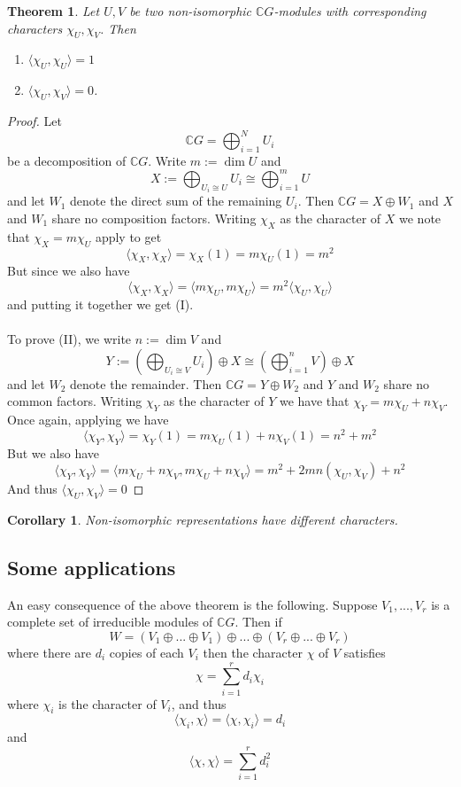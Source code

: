 \documentclass[11pt, notitlepage]{article}
\numberwithin{equation}{section}
\theoremstyle{plain}
\newtheorem{theorem}{Theorem}[section]
\newtheorem{corollary}{Corollary}[theorem]
\theoremstyle{definition}
\newcommand{\CG}{{\mathbb{C}G}}
\begin{document}
\begin{theorem}
	Let $U, V$ be two non-isomorphic $\CG$-modules with corresponding characters $\chi_U, \chi_V$. Then 
	\begin{enumerate}[label=\emph{(\Roman*)}]
		\item $\langle \chi_U, \chi_U \rangle = 1$
		\item $\langle \chi_U, \chi_V \rangle = 0$.
	\end{enumerate} 
\end{theorem}
\begin{proof}
	Let \[\CG = \bigoplus_{i = 1}^N U_i \] be a decomposition of $\CG$. Write $m:= \dim U$ and \[X:= \bigoplus_{U_i \cong U} U_i \cong \bigoplus_{i = 1}^{m} U\] and let $W_1$ denote the direct sum of the remaining $U_i$. Then $\CG = X \oplus W_1$ and $X$ and $W_1$ share no composition factors. Writing $\chi_X$ as the character of $X$ we note that $\chi_X = m\chi_U$ apply  to get \[ \langle \chi_X, \chi_X \rangle = \chi_X(1) = m \chi_U(1) = m^2\] But since we also have \[\langle \chi_X, \chi_X \rangle = \langle m\chi_U, m\chi_U \rangle = m^2 \langle \chi_U, \chi_U \rangle \] and putting it together we get (I).
	\\\\
	To prove (II), we write $n:= \dim V$ and \[Y:= \left(\bigoplus_{U_i \cong V} U_i\right)\oplus X \cong\left(\bigoplus_{i = 1}^{n} V\right) \oplus X \] and let $W_2$ denote the remainder. Then $\CG = Y \oplus W_2$ and $Y$ and $W_2$ share no common factors. Writing $\chi_Y$ as the character of $Y$ we have that $\chi_Y = m \chi_U + n \chi_V$. Once again, applying  we have \[ \langle \chi_Y, \chi_Y \rangle = \chi_Y(1) = m\chi_U(1) + n\chi_V(1) = n^2 + m^2\] But we also have \[ \langle \chi_Y, \chi_Y \rangle = \langle m\chi_U + n\chi_V, m\chi_U + n\chi_V \rangle = m^2  + 2mn(\chi_U, \chi_V) + n^2  \] And thus $ \langle \chi_U, \chi_V \rangle = 0$
\end{proof}
\begin{corollary}
	Non-isomorphic representations have different characters.
\end{corollary}

\subsection{Some applications}

An easy consequence of the above theorem is the following. Suppose $V_1,...,V_r$ is a complete set of irreducible modules of $\CG$. Then if \[W = (V_1\oplus...\oplus V_1) \oplus ...\oplus (V_r\oplus ... \oplus V_r)\] where there are $d_i$ copies of each $V_i$ then the character $\chi$ of $V$ satisfies \[\chi = \sum_{i = 1}^r d_i \chi_i \] where $\chi_i$ is the character of $V_i$, and thus $$ \langle \chi_i, \chi \rangle = \langle \chi, \chi_i \rangle = d_i$$ and $$\langle \chi, \chi \rangle = \sum_{i = 1}^r d_i ^2$$
\end{document}

